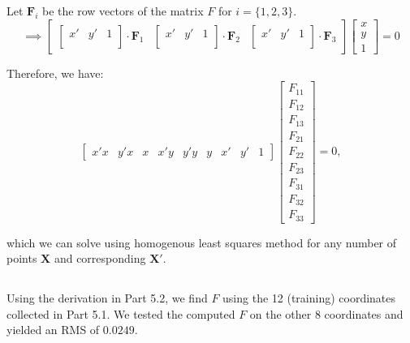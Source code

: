 Let ${\mathbf F_i}$ be the row vectors of the matrix $F$ for $i = \{1, 2, 3\}$.
\begin{equation*}
\implies
\begin{bmatrix}
\begin{bmatrix}
x' & y' & 1 \\
\end{bmatrix} \cdot {\mathbf F_1} 

&

\begin{bmatrix}
x' & y' & 1 \\
\end{bmatrix} \cdot {\mathbf F_2}

& 

\begin{bmatrix}
x' & y' & 1 \\
\end{bmatrix} \cdot {\mathbf F_3}  

\end{bmatrix}
\begin{bmatrix}
x \\
y \\
1
\end{bmatrix}
 = 0
\end{equation*}


Therefore, we have:
\begin{equation*}
\begin{bmatrix}
x'x & y'x & x & x'y & y'y & y & x' & y' & 1 
\end{bmatrix} 
\begin{bmatrix}
F_{11} \\
F_{12} \\
F_{13} \\
F_{21} \\
F_{22} \\
F_{23} \\
F_{31} \\
F_{32} \\
F_{33}
\end{bmatrix}
= 0,
\end{equation*}

which we can solve using homogenous least squares method for any number of points ${\mathbf X}$ and corresponding ${\mathbf X'}$. 

\subsection{} 
Using the derivation in Part 5.2, we find $F$ using the 12 (training) coordinates collected in Part 5.1. We tested the computed $F$ on the other $8$ coordinates and yielded an RMS of $0.0249$. 

